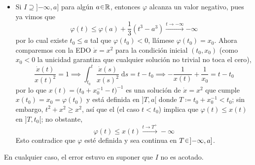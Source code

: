 \begin{sol}[Demostración]
\begin{itemize}
    \item Si $I \supseteq {]{-\infty}, a]}$ para algún $a \en \mathbb{R}$, entonces $\varphi$ alcanza un valor negativo, pues ya vimos que 
    \[
        \varphi(t) \leq \varphi(a) + \frac13(t^3 - a^3) \xrightarrow{t \to {-\infty}} {-\infty}
    \]
    por lo cual existe $t_0 \leq a$ tal que $\varphi(t_0) < 0$, llámese $\varphi(t_0) = x_0$. Ahora comparemos con la EDO $\dot{x} = x^2$ para la condición inicial $(t_0,x_0)$ (como $x_0 < 0$ la unicidad garantiza que cualquier solución no trivial no toca el cero), 
    \[
        \frac{\dot{x}(t)}{x(t)^2} = 1%
        \implies \int^t_{t_0}\frac{\dot{x}(s)}{x(s)^2}\;\mathrm{d}s = t - t_0%
        \implies -\frac{1}{x(t)} + \frac{1}{x_0} = t - t_0
    \]
    por lo que $x(t) = \big(t_0 + x_0^{-1} - t\big)^{-1}$ es una solución de $\dot{x} = x^2$ que cumple $x(t_0) = x_0 = \varphi(t_0)$ y está definida en ${]T, a[}$ donde $T \coloneq t_0 + x_0^{-1} < t_0$; sin embargo, $t^2 + x^2 \geq x^2$, así que el  (el caso $t < t_0$) implica que $\varphi(t) \leq x(t)$ en ${]T, t_0[}$; no obstante, 
    \[
        \varphi(t) \leq x(t) \xrightarrow{t\to T^+} -\infty
    \]
    Esto contradice que $\varphi$ esté definida y sea continua en $T \en {]{-\infty}, a]}$.
    \end{itemize}
    En cualquier caso, el error estuvo en suponer que $I$ no es acotado.
\end{sol}



